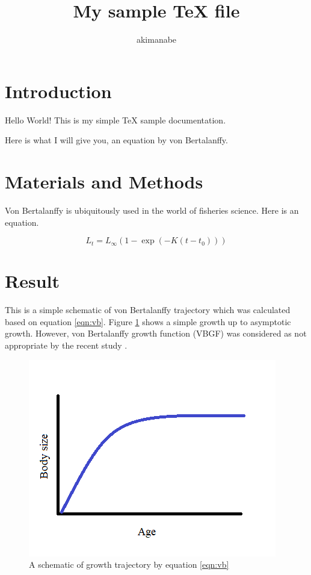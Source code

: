 \documentclass[a4paper,dvipdfmx]{jsarticle}
\begin{document}


\title{My sample TeX file}
\author{akimanabe}
\date{}

\maketitle

\section{Introduction}
Hello World! This is my simple TeX sample documentation.

Here is what I will give you, an equation by von Bertalanffy.

\section{Materials and Methods}

Von Bertalanffy is ubiquitously used in the world of fisheries science. Here is an equation.

\begin{equation}
\label{eqn:vb}
L_t = L_\infty (1-\exp(-K(t-t_0)))
\end{equation}

\section{Result}

This is a simple schematic of von Bertalanffy trajectory which was calculated based on equation \ref{eqn:vb}.
Figure \ref{fig:vb} shows a simple growth up to asymptotic growth.
However, von Bertalanffy growth function (VBGF) was considered as not appropriate by the recent study \citep{manabe2018-novel}.

\begin{figure}
  \includegraphics[width = \linewidth]{figs/samplevb.png}
  \caption{A schematic of growth trajectory by equation \ref{eqn:vb}}
  \label{fig:vb}
\end{figure}


\end{document}
